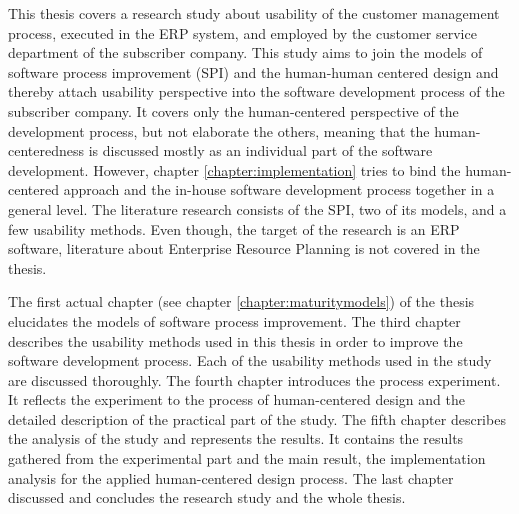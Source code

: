 \documentclass[12pt,a4paper,oneside,pdftex]{report}
\begin{document}
This thesis covers a research study about usability of the customer management process, executed in the ERP system, and employed by the customer service department of the subscriber company. This study aims to join the models of software process improvement (SPI) and the human-human centered design and thereby attach usability perspective into the software development process of the subscriber company. It covers only the human-centered perspective of the development process, but not elaborate the others, meaning that the human-centeredness is discussed mostly as an individual part of the software development. However, chapter \ref{chapter:implementation} tries to bind the human-centered approach and the in-house software development process together in a general level. The literature research consists of the SPI, two of its models, and a few usability methods. Even though, the target of the research is an ERP software, literature about Enterprise Resource Planning is not covered in the thesis.

The first actual chapter (see chapter \ref{chapter:maturitymodels}) of the thesis elucidates the models of software process improvement. The third chapter describes the usability methods used in this thesis in order to improve the software development process. Each of the usability methods used in the study are discussed thoroughly. The fourth chapter introduces the process experiment. It reflects the experiment to the process of human-centered design and the detailed description of the practical part of the study. The fifth chapter describes the analysis of the study and represents the results. It contains the results gathered from the experimental part and the main result, the implementation analysis for the applied human-centered design process. The last chapter discussed and concludes the research study and the whole thesis.

    
    





\end{document}
